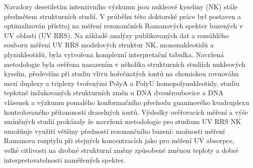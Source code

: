 \documentclass[12pt]{report}
\begin{document}

Navzdory desetiletím intenzivního výzkumu jsou nukleové kyseliny (NK) stále
předmětem strukturních studií.
V průběhu této doktorské práce byl postaven a optimalizován přístroj na měření
rezonančních Ramanových spekter buzených v UV oblasti (UV RRS).
Na základě analýzy publikovaných dat a rozsáhlého souboru měření UV RRS
modelových struktur NK, mononukleotidů a plynukleotidů, byla vytvořena
komplexní interpretační tabulka.
Navržená metodologie byla ověřena nasazením v několika strukturních studiích
nukleových kyselin, především při studiu vlivu hořečnatých iontů na chemickou
rovnováhu mezi duplexy a triplexy tvořenými PolyA a PolyU homopolynukleotidy,
studiu teplotně indukovaných strukturních změn u DNA dvoušroubovice a DNA
vlásenek a výzkumu pomalého konformačního přechodu guaninového kvadruplexu
kontrolovaného přítomností draselných iontů.
Výsledky ověřovacích měření a výše zmíněných studií prokázaly že navržená
metodologie pro studium UV RRS NK umožňuje využití většiny předností
rezonančního buzení: možnosti měření Ramanova rozptylu při stejných
koncentracích jako pro měření UV absorpce, velké citlivosti na drobné
strukturní změny způsobené změnou teploty a dobré interpretovatelnosti
naměřených spekter.
\end{document}
